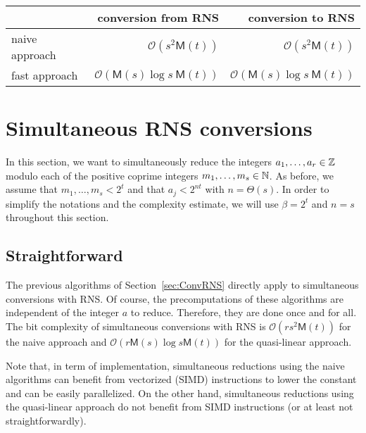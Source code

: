 \documentclass[acmtoms,acmnow]{acmtrans2m}
\def\M{\mathsf{M}} \def\I{\mathsf{I}} \def\R{\mathsf{R}} \def\Q{\mathbb{Q}}
\def\bigO{{\ensuremath{\mathcal{O}}}}
\begin{document}
\begin{table}[h]
\centering
\begin{tabular}{|l|r|r|}
\hline
               & conversion from RNS & conversion to RNS\\
\hline
naive approach & $\bigO(s^2\M(t))$ & $\bigO(s^2\M(t))$\\
fast approach  & $\bigO(\M(s)\log s~\M(t))$ & $\bigO(\M(s)\log s~\M(t))$ \\
\hline
\end{tabular}
\end{table}

\section{Simultaneous RNS conversions}

In this section, we want to simultaneously reduce the integers
$a_1, \ldots, a_r \in \mathbb{Z}$ modulo each of the positive coprime integers
$m_1, \ldots, m_s \in \mathbb{N}$.
As before, we assume that $m_1, \ldots, m_s < 2^t$ and that $a_j < 2^{nt}$ with $n=\Theta(s)$. In order to simplify the notations and the complexity estimate, we will use $\beta=2^t$ and $n=s$ throughout this section.

\subsection{Straightforward}

The previous algorithms of Section~\ref{sec:ConvRNS} directly apply to
simultaneous conversions with RNS. Of course, the precomputations of these
algorithms are independent of the integer $a$ to reduce. Therefore, they are
done once and for all. The bit complexity of simultaneous conversions with RNS is
$\bigO \left( rs^2 \M (t)\right)$ for the naive approach and
$\bigO \left( r \M(s) \log s \M(t)\right)$ for the quasi-linear
approach.

Note that, in term of implementation, simultaneous reductions using the naive
algorithms can benefit from vectorized (SIMD) instructions to lower the constant
and can be easily parallelized. On the other hand, simultaneous reductions using
the quasi-linear approach do not benefit from SIMD instructions (or at least not
straightforwardly).
\end{document}
